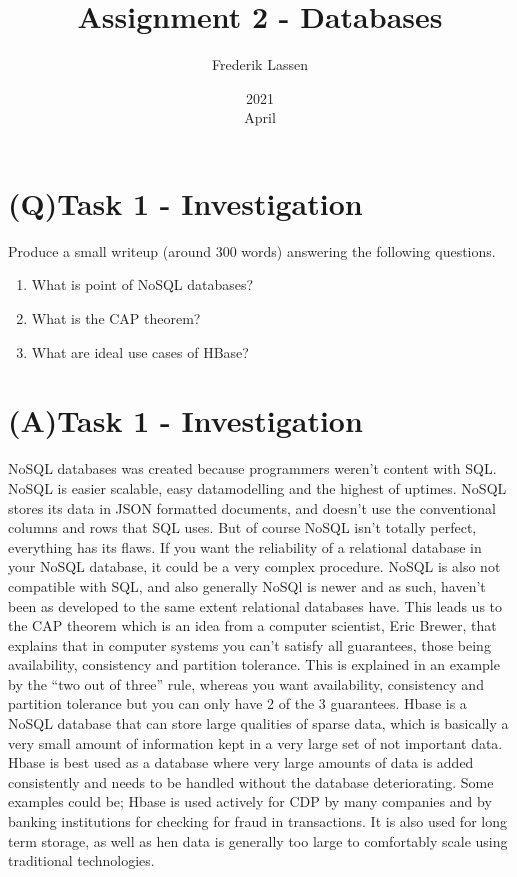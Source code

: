 \documentclass[a4paper,12pt]{article}
\title{Assignment 2 - Databases}
\date{2021\\April}
\author{Frederik Lassen}
\begin{document}
\maketitle
\thispagestyle{empty}
\clearpage
{}

\tableofcontents
\clearpage

\section{(Q)Task 1 - Investigation}
Produce a small writeup (around 300 words) answering the following questions. \\
\begin{enumerate}
\item What is point of NoSQL databases?
\item What is the CAP theorem?
\item What are ideal use cases of HBase?
\end{enumerate}

\section{(A)Task 1 - Investigation}
NoSQL databases was created because programmers weren’t content with SQL. NoSQL is easier scalable, easy datamodelling and the highest of uptimes. NoSQL stores its data in JSON formatted documents, and doesn’t use the conventional columns and rows that SQL uses. But of course NoSQL isn’t totally perfect, everything has its flaws. If you want the reliability of a relational database in your NoSQL database, it could be a very complex procedure. NoSQL is also not compatible with SQL, and also generally NoSQl is newer and as such, haven’t been as developed to the same extent relational databases have. This leads us to the CAP theorem which is an idea from a computer scientist, Eric Brewer, that explains that in computer systems you can’t satisfy all guarantees, those being availability, consistency and partition tolerance. This is explained in an example by the “two out of three” rule, whereas you want availability, consistency and partition tolerance but you can only have 2 of the 3 guarantees. 
Hbase is a NoSQL database that can store large qualities of sparse data, which is basically a very small amount of information kept in a very large set of not important data. Hbase is best used as a database where very large amounts of data is added consistently and needs to be handled without the database deteriorating. Some examples could be; Hbase is used actively for CDP by many companies and by banking institutions for checking for fraud in transactions. It is also used for long term storage, as well as hen data is generally too large to comfortably scale using traditional technologies.
\end{document}
